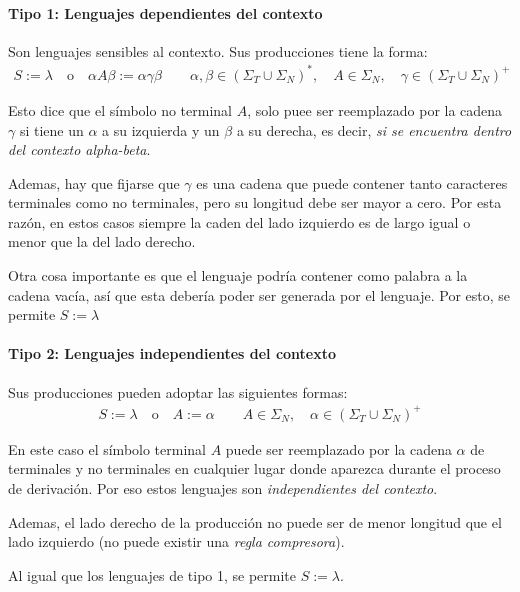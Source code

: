 \documentclass[12pt]{article}
\begin{document}
\paragraph{Tipo 1: Lenguajes dependientes del contexto}\mbox{}

Son lenguajes sensibles al contexto. Sus producciones tiene la forma:
\begin{align*}
  S:= \lambda \quad \text{o} \quad \alpha A \beta := \alpha\gamma\beta \qquad \alpha,\beta \in \left(\Sigma_{T}\cup \Sigma_{N}\right)^{*}, \quad A \in \Sigma_{N}, \quad \gamma \in \left(\Sigma_{T}\cup \Sigma_{N}\right)^{+}
\end{align*}

Esto dice que el símbolo no terminal $ A $, solo puee ser reemplazado por la cadena $ \gamma $ si tiene un $ \alpha $ a su izquierda y un $ \beta $ a su derecha, es decir, \textit{si se encuentra dentro del contexto alpha-beta}.

Ademas, hay que fijarse que $ \gamma $ es una cadena que puede contener tanto caracteres terminales como no terminales, pero su longitud debe ser mayor a cero. Por esta razón, en estos casos siempre la caden del lado izquierdo es de largo igual o menor que la del lado derecho. 

Otra cosa importante es que el lenguaje podría contener como palabra a la cadena vacía, así que esta debería poder ser generada por el lenguaje. Por esto, se permite $ S:=\lambda $

\paragraph{Tipo 2: Lenguajes independientes del contexto}\mbox{}

Sus producciones pueden adoptar las siguientes formas:
\begin{align*}
  S:=\lambda \quad \text{o} \quad A:=\alpha \qquad A\in \Sigma_{N}, \quad \alpha \in \left(\Sigma_{T}\cup \Sigma_{N}\right)^{+}
\end{align*}

En este caso el símbolo terminal $ A $ puede ser reemplazado por la cadena $ \alpha $ de terminales y no terminales en cualquier lugar donde aparezca durante el proceso de derivación. Por eso estos lenguajes son \textit{independientes del contexto}.

Ademas, el lado derecho de la producción no puede ser de menor longitud que el lado izquierdo (no puede existir una \textit{regla compresora}).

Al igual que los lenguajes de tipo 1, se permite $ S:=\lambda $.
\end{document}
